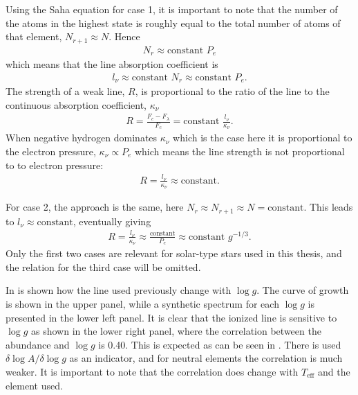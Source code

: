 Using the Saha equation for case 1, it is important to note that the number of
the atoms in the highest state is roughly equal to the total number of atoms of
that element, $N_{r+1}\approx N$. Hence
\begin{align}
  N_r \approx \mathrm{constant}\,\, P_e
\end{align}
which means that the line absorption coefficient is
\begin{align}
  l_\nu \approx \mathrm{constant}\,\, N_r \approx \mathrm{constant}\,\, P_e.
\end{align}
The strength of a weak line, $R$, is proportional to the ratio of the line to
the continuous absorption coefficient, $\kappa_\nu$
\begin{align}
  R = \frac{F_c-F_\lambda}{F_c} = \mathrm{constant}\,\, \frac{l_\nu}{\kappa_\nu}.
\end{align}
When negative hydrogen dominates $\kappa_\nu$ which is the case here it is
proportional to the electron pressure, $\kappa_\nu\propto P_e$ which means the
line strength is not proportional to to electron pressure:
\begin{align}
  R = \frac{l_\nu}{\kappa_\nu} \approx \mathrm{constant}.
\end{align}

For case 2, the approach is the same, here
$N_r\approx N_{r+1}\approx N= \mathrm{constant}$. This leads to
$l_\nu\approx\mathrm{constant}$, eventually giving
\begin{align}
  R=\frac{l_\nu}{\kappa_\nu} \approx \frac{\mathrm{constant}}{P_e} \approx \mathrm{constant}\,\, g^{-1/3}.
\end{align}
Only the first two cases are relevant for solar-type stars used in this thesis,
and the relation for the third case will be omitted.

In  is shown how the  line used previously
change with $\log g$. The curve of growth is shown in the upper panel, while a
synthetic spectrum for each $\log g$ is presented in the lower left panel. It is
clear that the ionized line is sensitive to $\log g$ as shown in the lower right
panel, where the correlation between the abundance and $\log g$ is 0.40. This is
expected as can be seen in \citet[][Table 16.1]{Gray2006}. There is used
$\delta\log A/\delta\log g$ as an indicator, and for neutral elements the
correlation is much weaker. It is important to note that the correlation does
change with $T_\mathrm{eff}$ and the element used.


